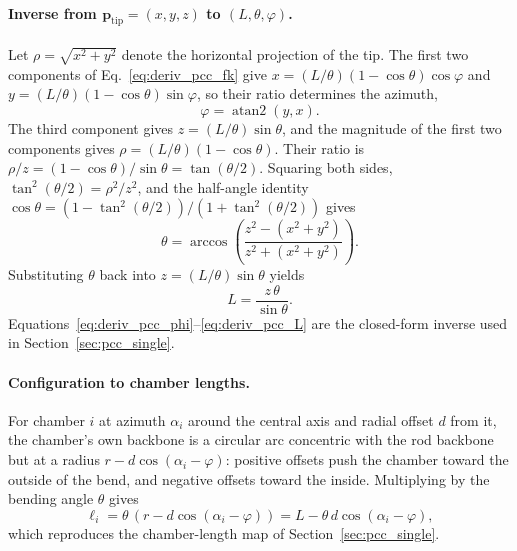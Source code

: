 \paragraph{Inverse from $\mathbf{p}_{\mathrm{tip}} = (x, y, z)$ to $(L, \theta, \varphi)$.}
Let $\rho = \sqrt{x^{2} + y^{2}}$ denote the horizontal projection of the tip. The first two components of Eq.~\eqref{eq:deriv_pcc_fk} give
$x = (L/\theta)(1 - \cos\theta)\cos\varphi$ and $y = (L/\theta)(1 - \cos\theta)\sin\varphi$, so their ratio determines the azimuth,
\begin{equation}
  \varphi = \operatorname{atan2}(y, x).
  \label{eq:deriv_pcc_phi}
\end{equation}
The third component gives $z = (L/\theta)\sin\theta$, and the magnitude of the first two components gives $\rho = (L/\theta)(1 - \cos\theta)$. Their ratio is
$\rho / z = (1 - \cos\theta)/\sin\theta = \tan(\theta/2)$.
Squaring both sides, $\tan^{2}(\theta/2) = \rho^{2}/z^{2}$, and the half-angle identity $\cos\theta = (1 - \tan^{2}(\theta/2))/(1 + \tan^{2}(\theta/2))$ gives
\begin{equation}
  \theta = \arccos\!\left(\frac{z^{2} - (x^{2} + y^{2})}{z^{2} + (x^{2} + y^{2})}\right).
  \label{eq:deriv_pcc_theta}
\end{equation}
Substituting $\theta$ back into $z = (L/\theta)\sin\theta$ yields
\begin{equation}
  L = \frac{z \, \theta}{\sin\theta}.
  \label{eq:deriv_pcc_L}
\end{equation}
Equations~\eqref{eq:deriv_pcc_phi}--\eqref{eq:deriv_pcc_L} are the closed-form inverse used in Section~\ref{sec:pcc_single}.

\paragraph{Configuration to chamber lengths.}
For chamber $i$ at azimuth $\alpha_{i}$ around the central axis and radial offset $d$ from it, the chamber's own backbone is a circular arc concentric with the rod backbone but at a radius $r - d\cos(\alpha_{i} - \varphi)$: positive offsets push the chamber toward the outside of the bend, and negative offsets toward the inside. Multiplying by the bending angle $\theta$ gives
\begin{equation}
  \ell_{i} = \theta \, (r - d\cos(\alpha_{i} - \varphi)) = L - \theta \, d \cos(\alpha_{i} - \varphi),
  \label{eq:deriv_pcc_lengths}
\end{equation}
which reproduces the chamber-length map of Section~\ref{sec:pcc_single}.

